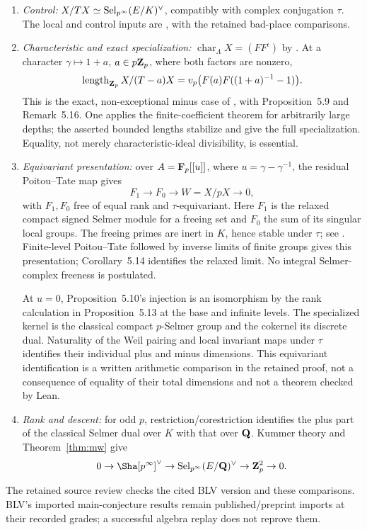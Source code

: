 \begin{enumerate}[label=(I\arabic*)]
\item \emph{Control:} $X/TX\simeq\operatorname{Sel}_{p^\infty}(E/K)^\vee$, compatibly with complex conjugation $\tau$. The local and control inputs are \cite[Props.~5.3, 5.9, Cor.~5.5]{blv}, with the retained bad-place comparisons.
\item \emph{Characteristic and exact specialization:} $\operatorname{char}_\Lambda X=(FF^\iota)$ by \cite[Thm.~7.3]{blv}. At a character $\gamma\mapsto1+a$, $a\in p\mathbf{Z}_p$, where both factors are nonzero,
\[
 \operatorname{length}_{\mathbf{Z}_p}X/(T-a)X
 =v_p\bigl(F(a)F((1+a)^{-1}-1)\bigr).
\]
This is the exact, non-exceptional minus case of \cite[Thm.~7.1]{blv}, with Proposition~5.9 and Remark~5.16. One applies the finite-coefficient theorem for arbitrarily large depths; the asserted bounded lengths stabilize and give the full specialization. Equality, not merely characteristic-ideal divisibility, is essential.
\item \emph{Equivariant presentation:} over $A=\mathbf{F}_p[[u]]$, where $u=\gamma-\gamma^{-1}$, the residual Poitou--Tate map gives
\[
 F_1\longrightarrow F_0\longrightarrow W=X/pX\longrightarrow0,
\]
with $F_1,F_0$ free of equal rank and $\tau$-equivariant. Here $F_1$ is the relaxed compact signed Selmer module for a freeing set and $F_0$ the sum of its singular local groups. The freeing primes are inert in $K$, hence stable under $\tau$; see \cite[\S3.2, Lemma~3.1, Prop.~5.13]{blv}. Finite-level Poitou--Tate followed by inverse limits of finite groups gives this presentation; Corollary~5.14 identifies the relaxed limit. No integral Selmer-complex freeness is postulated.

At $u=0$, Proposition~5.10's injection is an isomorphism by the rank calculation in Proposition~5.13 at the base and infinite levels. The specialized kernel is the classical compact $p$-Selmer group and the cokernel its discrete dual. Naturality of the Weil pairing and local invariant maps under $\tau$ identifies their individual plus and minus dimensions. This equivariant identification is a written arithmetic comparison in the retained proof, not a consequence of equality of their total dimensions and not a theorem checked by Lean.
\item \emph{Rank and descent:} for odd $p$, restriction/corestriction identifies the plus part of the classical Selmer dual over $K$ with that over $\mathbf{Q}$. Kummer theory and Theorem~\ref{thm:mw} give
\[
0\to\Sha[p^\infty]^\vee\to\Sel_{p^\infty}(E/\Q)^\vee\to\Zp^2\to0.
\]
\end{enumerate}
The retained source review checks the cited BLV version and these comparisons. BLV's imported main-conjecture results remain published/preprint imports at their recorded grades; a successful algebra replay does not reprove them.

